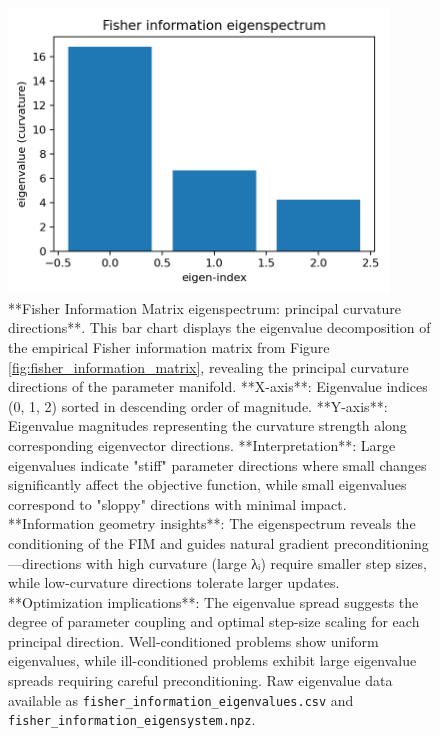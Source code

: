 \documentclass[
  10pt,
]{article}
\begin{document}
\begin{figure}[htbp]
\centering
\includegraphics[width=0.9\textwidth]{figures/fisher_information_eigenspectrum.png}
\caption{**Fisher Information Matrix eigenspectrum: principal curvature directions**. This bar chart displays the eigenvalue decomposition of the empirical Fisher information matrix from Figure \ref{fig:fisher_information_matrix}, revealing the principal curvature directions of the parameter manifold. **X-axis**: Eigenvalue indices (0, 1, 2) sorted in descending order of magnitude. **Y-axis**: Eigenvalue magnitudes representing the curvature strength along corresponding eigenvector directions. **Interpretation**: Large eigenvalues indicate "stiff" parameter directions where small changes significantly affect the objective function, while small eigenvalues correspond to "sloppy" directions with minimal impact. **Information geometry insights**: The eigenspectrum reveals the conditioning of the FIM and guides natural gradient preconditioning—directions with high curvature (large λᵢ) require smaller step sizes, while low-curvature directions tolerate larger updates. **Optimization implications**: The eigenvalue spread suggests the degree of parameter coupling and optimal step-size scaling for each principal direction. Well-conditioned problems show uniform eigenvalues, while ill-conditioned problems exhibit large eigenvalue spreads requiring careful preconditioning. Raw eigenvalue data available as \texttt{fisher\_information\_eigenvalues.csv} and \texttt{fisher\_information\_eigensystem.npz}.}
\label{fig:fim_eigenspectrum}
\end{figure}
\end{document}
